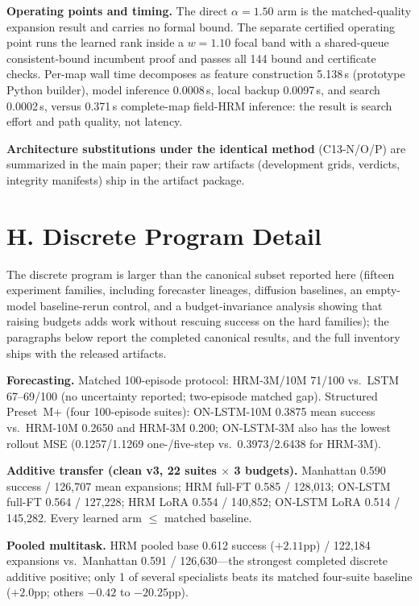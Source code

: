 \documentclass[letterpaper]{article} %
\newcommand{\stage}[1]{\textsc{#1}}
\begin{document}
\textbf{Operating points and timing.} The direct $\alpha{=}1.50$ arm is the matched-quality expansion result and carries no formal bound. The separate certified operating point runs the learned rank inside a $w{=}1.10$ focal band with a shared-queue consistent-bound incumbent proof and passes all 144 bound and certificate checks. Per-map wall time decomposes as feature construction 5.138\,s (prototype Python builder), model inference 0.0008\,s, local backup 0.0097\,s, and search 0.0002\,s, versus 0.371\,s complete-map field-HRM inference: the result is search effort and path quality, not latency.

\textbf{Architecture substitutions under the identical method} (\stage{C13-N/O/P}) are summarized in the main paper; their raw artifacts (development grids, verdicts, integrity manifests) ship in the artifact package.

\section{H. Discrete Program Detail}

The discrete program is larger than the canonical subset reported here (fifteen experiment families, including forecaster lineages, diffusion baselines, an empty-model baseline-rerun control, and a budget-invariance analysis showing that raising budgets adds work without rescuing success on the hard families); the paragraphs below report the completed canonical results, and the full inventory ships with the released artifacts.

\textbf{Forecasting.} Matched 100-episode protocol: HRM-3M/10M 71/100 vs.\ LSTM 67--69/100 (no uncertainty reported; two-episode matched gap). Structured Preset~M+ (four 100-episode suites): ON-LSTM-10M 0.3875 mean success vs.\ HRM-10M 0.2650 and HRM-3M 0.200; ON-LSTM-3M also has the lowest rollout MSE (0.1257/1.1269 one-/five-step vs.\ 0.3973/2.6438 for HRM-3M).

\textbf{Additive transfer (clean v3, 22 suites $\times$ 3 budgets).} Manhattan 0.590 success / 126{,}707 mean expansions; HRM full-FT 0.585 / 128{,}013; ON-LSTM full-FT 0.564 / 127{,}228; HRM LoRA 0.554 / 140{,}852; ON-LSTM LoRA 0.514 / 145{,}282. Every learned arm $\leq$ matched baseline.

\textbf{Pooled multitask.} HRM pooled base 0.612 success ($+2.11$pp) / 122{,}184 expansions vs.\ Manhattan 0.591 / 126{,}630---the strongest completed discrete additive positive; only 1 of several specialists beats its matched four-suite baseline ($+2.0$pp; others $-0.42$ to $-20.25$pp).
\end{document}
